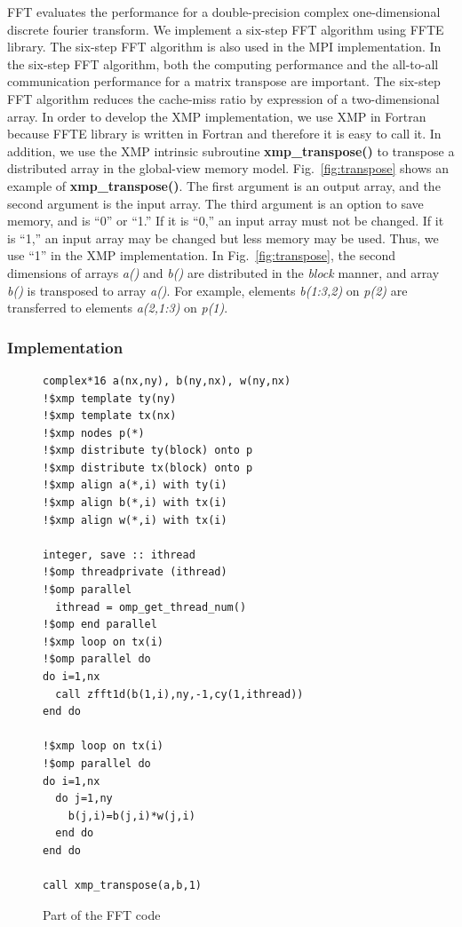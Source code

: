 \documentclass[graybox]{svmult}
\begin{document}
FFT evaluates the performance for a double-precision complex one-dimensional discrete fourier transform.
We implement a six-step FFT algorithm\cite{fft1, fft2} using FFTE library\cite{ffte}.
The six-step FFT algorithm is also used in the MPI implementation.
In the six-step FFT algorithm,
both the computing performance and the all-to-all communication performance for a matrix transpose are important.
The six-step FFT algorithm reduces the cache-miss ratio by expression of a two-dimensional array.
In order to develop the XMP implementation,
we use XMP in Fortran because FFTE library is written in Fortran and therefore it is easy to call it.
In addition, we use the XMP intrinsic subroutine {\bf xmp\_transpose()} to transpose a distributed array in the global-view memory model.
Fig.~\ref{fig:transpose} shows an example of {\bf xmp\_transpose()}.
The first argument is an output array, and the second argument is the input array.
The third argument is an option to save memory, and is ``0'' or ``1.''
If it is ``0,'' an input array must not be changed.
If it is ``1,'' an input array may be changed but less memory may be used.
Thus, we use ``1'' in the XMP implementation.
In Fig.~\ref{fig:transpose},
the second dimensions of arrays {\it a()} and {\it b()} are distributed in the {\it block} manner,
and array {\it b()} is transposed to array {\it a()}.
For example,
elements {\it b(1:3,2)} on {\it p(2)} are transferred to elements {\it a(2,1:3)} on {\it p(1)}.

\subsubsection{Implementation}
\begin{figure}[h]
\begin{lstlisting}
complex*16 a(nx,ny), b(ny,nx), w(ny,nx)
!$xmp template ty(ny)
!$xmp template tx(nx)
!$xmp nodes p(*)
!$xmp distribute ty(block) onto p
!$xmp distribute tx(block) onto p
!$xmp align a(*,i) with ty(i)
!$xmp align b(*,i) with tx(i)
!$xmp align w(*,i) with tx(i)

integer, save :: ithread
!$omp threadprivate (ithread)
!$omp parallel
  ithread = omp_get_thread_num()
!$omp end parallel
!$xmp loop on tx(i)
!$omp parallel do
do i=1,nx
  call zfft1d(b(1,i),ny,-1,cy(1,ithread))
end do

!$xmp loop on tx(i)
!$omp parallel do
do i=1,nx
  do j=1,ny
    b(j,i)=b(j,i)*w(j,i)
  end do
end do

call xmp_transpose(a,b,1)
\end{lstlisting}
\caption{Part of the FFT code\cite{hpca}}\label{fig:code-fft}
\end{figure}
\end{document}
